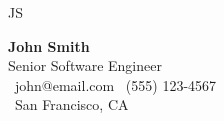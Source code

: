 \documentclass[11pt,a4paper]{article}
\begin{document}
\begin{minipage}[t]{0.3\textwidth}
    \vspace{0pt}
    \begin{center}
        \textcolor{primary}{\Huge JS}
    \end{center}
\end{minipage}
\begin{minipage}[t]{0.7\textwidth}
    \vspace{0pt}
    {\Huge\textbf{John Smith}}\\[4pt]
    {\large\textcolor{primary}{Senior Software Engineer}}\\[4pt]
    \textcolor{subtext}{
        \faEnvelope\ john@email.com \quad
        \faPhone\ (555) 123-4567\\
        \faMapMarker\ San Francisco, CA
    }
\end{minipage}

\vspace{1em}
\end{document}
